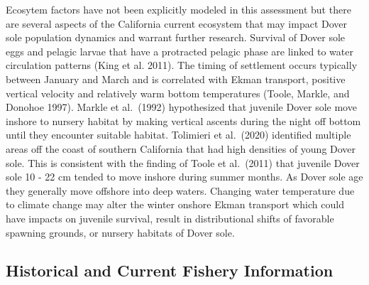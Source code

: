 \documentclass[11pt,
  english,
  a4paper,
]{article}
\begin{document}
\leavevmode\tagmcend\tagstructend


Ecosytem factors have not been explicitly modeled in this assessment but there are several aspects of the California current ecosystem that may impact Dover sole population dynamics and warrant further research. Survival of Dover sole eggs and pelagic larvae that have a protracted pelagic phase are linked to water circulation patterns {(King et al. 2011)\leavevmode\tagmcend\tagstructend}. The timing of settlement occurs typically between January and March and is correlated with Ekman transport, positive vertical velocity and relatively warm bottom temperatures {(Toole, Markle, and Donohoe 1997)\leavevmode\tagmcend\tagstructend}. Markle et al.~{(1992)\leavevmode\tagmcend\tagstructend} hypothesized that juvenile Dover sole move inshore to nursery habitat by making vertical ascents during the night off bottom until they encounter suitable habitat. Tolimieri et al.~{(2020)\leavevmode\tagmcend\tagstructend} identified multiple areas off the coast of southern California that had high densities of young Dover sole. This is consistent with the finding of Toole et al.~{(2011)\leavevmode\tagmcend\tagstructend} that juvenile Dover sole 10 - 22 cm tended to move inshore during summer months. As Dover sole age they generally move offshore into deep waters. Changing water temperature due to climate change may alter the winter onshore Ekman transport which could have impacts on juvenile survival, result in distributional shifts of favorable spawning grounds, or nursery habitats of Dover sole.

\leavevmode\tagmcend\tagstructend\par


\hypertarget{historical-and-current-fishery-information}{%
\subsection{Historical and Current Fishery Information}\label{historical-and-current-fishery-information}}

\leavevmode\tagmcend\tagstructend
\end{document}
